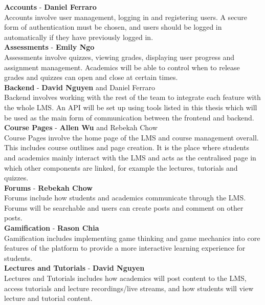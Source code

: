 \textbf{Accounts} - \textbf{Daniel Ferraro} \\
Accounts involve user management, logging in and registering users. A secure form of authentication must be chosen, and users should be logged in automatically if they have previously logged in. \\

\textbf{Assessments} - \textbf{Emily Ngo} \\
Assessments involve quizzes, viewing grades, displaying user progress and assignment management. Academics will be able to control when to release grades and quizzes can open and close at certain times. \\

\textbf{Backend} - \textbf{David Nguyen} and Daniel Ferraro \\
Backend involves working with the rest of the team to integrate each feature with the whole LMS. An API will be set up using tools listed in this thesis which will be used as the main form of communication between the frontend and backend. \\

\textbf{Course Pages} - \textbf{Allen Wu} and Rebekah Chow \\
Course Pages involve the home page of the LMS and course management overall. This includes course outlines and page creation. It is the place where students and academics mainly interact with the LMS and acts as the centralised page in which other components are linked, for example the lectures, tutorials and quizzes. \\

\textbf{Forums} - \textbf{Rebekah Chow} \\
Forums include how students and academics communicate through the LMS. Forums will be searchable and users can create posts and comment on other posts.\\

\textbf{Gamification} - \textbf{Rason Chia} \\
Gamification includes implementing game thinking and game mechanics into core features of the platform to provide a more interactive learning experience for students.\\

\textbf{Lectures and Tutorials} - \textbf{David Nguyen} \\
Lectures and Tutorials includes how academics will post content to the LMS, access tutorials and lecture recordings/live streams, and how students will view lecture and tutorial content.\\

